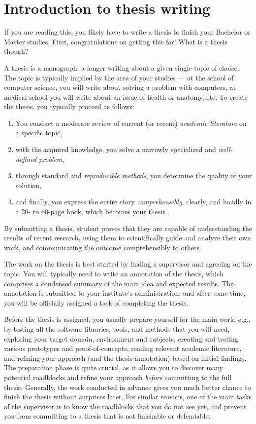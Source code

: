 \chapter{Introduction to thesis writing}
\label{chap:refs}


If you are reading this, you likely have to write a thesis to finish your Bachelor or Master studies. First, congratulations on getting this far! What is a thesis though?

A thesis is a monograph, a longer writing about a given single topic of choice. The topic is typically implied by the area of your studies --- at the school of computer science, you will write about solving a problem with computers, at medical school you will write about an issue of health or anatomy, etc. To create the thesis, you typically proceed as follows:
\begin{enumerate}
\item You conduct a moderate review of current (or recent) \emph{academic literature} on a specific topic,
\item with the acquired knowledge, you solve a narrowly specialized and \emph{well-defined problem},
\item through standard and \emph{reproducible methods}, you determine the quality of your solution,\item and finally, you express the entire story \emph{comprehensibly}, clearly, and lucidly in a 20- to 60-page book, which becomes your thesis.
\end{enumerate}

By submitting a thesis, student proves that they are capable of understanding the results of recent research, using them to scientifically guide and analyze their own work, and communicating the outcome comprehensibly to others.

The work on the thesis is best started by finding a supervisor and agreeing on the topic. You will typically need to write an annotation of the thesis, which comprises a condensed summary of the main idea and expected results. The annotation is submitted to your institute's administration, and after some time, you will be officially assigned a task of completing the thesis.

Before the thesis is assigned, you usually prepare yourself for the main work; e.g., by testing all the software libraries, tools, and methods that you will need, exploring your target domain, environment and subjects, creating and testing various prototypes and proof-of-concepts, reading relevant academic literature, and refining your approach (and the thesis annotation) based on initial findings.  The preparation phase is quite crucial, as it allows you to discover many potential roadblocks and refine your approach \emph{before} committing to the full thesis. Generally, the work conducted in advance gives you much better chance to finish the thesis without surprises later. For similar reasons, one of the main tasks of the supervisor is to know the roadblocks that you do not see yet, and prevent you from committing to a thesis that is not finishable or defendable.

